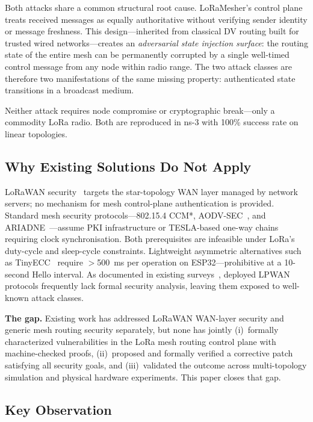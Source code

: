 \documentclass[preprint,12pt]{elsarticle}
\begin{document}
Both attacks share a common structural root cause.
LoRaMesher's control plane treats received messages as equally
authoritative without verifying sender identity or message
freshness.
This design—inherited from classical DV routing built for
trusted wired networks—creates an \emph{adversarial state
injection surface}: the routing state of the entire mesh can be
permanently corrupted by a single well-timed control message
from any node within radio range.
The two attack classes are therefore two manifestations of the
same missing property: authenticated state transitions in a
broadcast medium.

Neither attack requires node compromise or cryptographic break—only
a commodity LoRa radio.
Both are reproduced in ns-3 with 100\% success rate on linear
topologies.

\subsection{Why Existing Solutions Do Not Apply}

LoRaWAN security~\cite{ieee2025-lorawan-key-vulnerability,ieee2025-lorawan-key-verification,mohamed2022-lorawan-gateways,butun2019-lorawan-security-risk}
targets the star-topology WAN layer managed by network servers;
no mechanism for mesh control-plane authentication is provided.
Standard mesh security protocols—802.15.4 CCM*, AODV-SEC~\cite{hu2002-sead},
and ARIADNE~\cite{hu2002-ariadne}—assume PKI infrastructure or
TESLA-based one-way chains requiring clock synchronisation.
Both prerequisites are infeasible under LoRa's duty-cycle and
sleep-cycle constraints.
Lightweight asymmetric alternatives such as
TinyECC~\cite{liu2008-tinyecc} require $>$500~ms per operation
on ESP32—prohibitive at a 10-second Hello interval.
As documented in existing surveys~\cite{hessel2022-lorawan-survey,butun2019-lorawan-security-risk},
deployed LPWAN protocols frequently lack formal security
analysis, leaving them exposed to well-known attack classes.

\textbf{The gap.} Existing work has addressed LoRaWAN WAN-layer
security and generic mesh routing security separately, but none has
jointly (i)~formally characterized vulnerabilities in the LoRa mesh
routing control plane with machine-checked proofs, (ii)~proposed
and formally verified a corrective patch satisfying all security
goals, and (iii)~validated the outcome across multi-topology
simulation and physical hardware experiments. This paper closes
that gap.

\subsection{Key Observation}
\label{sec:key-observation}
\end{document}

